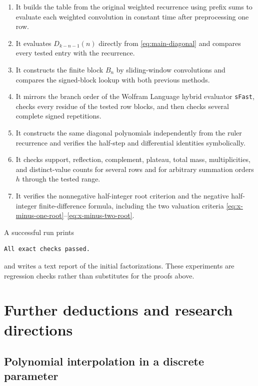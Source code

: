 \documentclass[11pt,oneside]{article}
\numberwithin{equation}{section}
\theoremstyle{definition}
\theoremstyle{remark}
\newcommand{\Diag}{D}
\begin{document}
\begin{enumerate}
\item It builds the table from the original weighted recurrence using prefix
sums to evaluate each weighted convolution in constant time after preprocessing
one row.

\item It evaluates \(\Diag_{k-n-1}(n)\) directly from
\eqref{eq:main-diagonal} and compares every tested entry with the recurrence.

\item It constructs the finite block \(B_n\) by sliding-window convolutions
and compares the signed-block lookup with both previous methods.

\item It mirrors the branch order of the Wolfram Language hybrid evaluator
\texttt{sFast}, checks every residue of the tested row blocks, and then checks
several complete signed repetitions.

\item It constructs the same diagonal polynomials independently from the
ruler recurrence and verifies the half-step and differential identities
symbolically.

\item It checks support, reflection, complement, plateau, total mass,
multiplicities, and distinct-value counts for several rows and for arbitrary
summation orders \(h\) through the tested range.

\item It verifies the nonnegative half-integer root criterion and the negative
half-integer finite-difference formula, including the two valuation criteria
\eqref{eq:x-minus-one-root}--\eqref{eq:x-minus-two-root}.
\end{enumerate}

A successful run prints
\begin{lstlisting}
All exact checks passed.
\end{lstlisting}
and writes a text report of the initial factorizations.  These experiments are
regression checks rather than substitutes for the proofs above.

\section{Further deductions and research directions}

\subsection{Polynomial interpolation in a discrete parameter}
\end{document}
